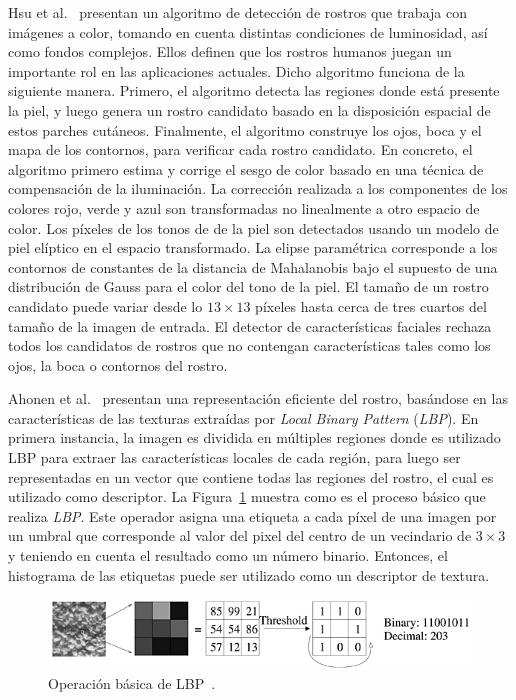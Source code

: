 Hsu et al.~\cite{Hsu2002} presentan un algoritmo de detección de rostros que trabaja con imágenes a color, tomando en cuenta distintas condiciones de luminosidad, así como fondos complejos. Ellos definen que los rostros humanos juegan un importante rol en las aplicaciones actuales. Dicho algoritmo funciona de la siguiente manera. Primero, el algoritmo detecta las regiones donde está presente la piel, y luego genera un rostro candidato basado en la disposición espacial de estos parches cutáneos. Finalmente, el algoritmo construye los ojos, boca y el mapa de los contornos, para verificar cada rostro candidato. En concreto, el algoritmo primero estima y corrige el sesgo de color basado en una técnica de compensación de la iluminación. La corrección realizada a los componentes de los colores rojo, verde y azul son transformadas no linealmente a otro espacio de color. Los píxeles de los tonos de de la piel son detectados usando un modelo de piel elíptico en el espacio transformado. La elipse paramétrica corresponde a los contornos de constantes de la distancia de Mahalanobis bajo el supuesto de una distribución de Gauss para el color del tono de la piel. El tamaño de un rostro candidato puede variar desde lo $13 \times 13$ píxeles hasta cerca de tres cuartos del tamaño de la imagen de entrada. El detector de características faciales rechaza todos los candidatos de rostros que no contengan características tales como los ojos, la boca o contornos del rostro.

Ahonen et al.~\cite{ahonen2006} presentan una representación eficiente del rostro, basándose en las características de las texturas extraídas por \textit{Local Binary Pattern} (\textit{LBP}). En primera instancia, la imagen es dividida en múltiples regiones donde es utilizado LBP para extraer las características locales de cada región, para luego ser representadas en un vector que contiene todas las regiones del rostro, el cual es utilizado como descriptor. La Figura~\ref{fig:lbp} muestra como es el proceso básico que realiza \textit{LBP}. Este operador asigna una etiqueta a cada píxel de una imagen por un umbral que corresponde al valor del pixel del centro de un vecindario de $3 \times 3$ y teniendo en cuenta el resultado como un número binario. Entonces, el histograma de las etiquetas puede ser utilizado como un descriptor de textura.

\begin{figure}[tb]
 \centering
  \includegraphics[width=1\textwidth]{Figuras/lbp.jpg}
  \caption[Operación básica de LBP]{Operación básica de LBP~\cite{ahonen2006}.}
  \label{fig:lbp}
\end{figure}

